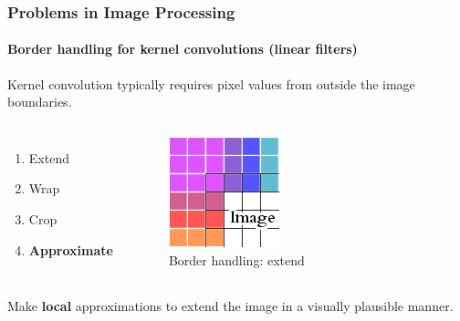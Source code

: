 \documentclass{beamer}
\begin{document}
\begin{frame}
\frametitle{Problems in Image Processing}
\framesubtitle{Border handling for kernel convolutions (linear filters)}

Kernel convolution typically requires pixel values from outside the image boundaries.

\begin{columns}[c] %
\begin{enumerate}
	\item Extend
	\item Wrap
	\item Crop
	\item \textbf{Approximate} 
\end{enumerate}
\begin{figure} %
\centering
	\includegraphics[width=0.3\columnwidth]{../figures/Extend_Edge-Handling}
\caption{Border handling: extend}
\end{figure}
\end{columns}

Make \textbf{local} approximations to extend the image in a visually plausible manner.

\end{frame}

\end{document}
